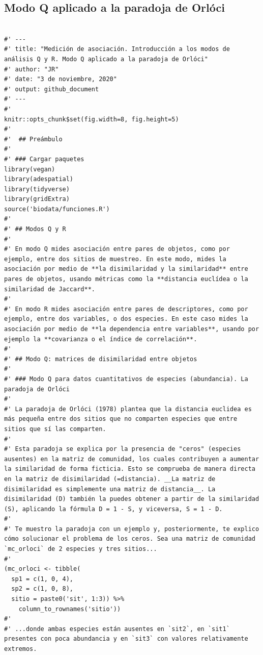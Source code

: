 \documentclass[11pt,]{article}
\begin{document}
\subsection{Modo Q aplicado a la paradoja de
Orlóci}\label{modo-q-aplicado-a-la-paradoja-de-orluxf3ci-1}

\begin{verbatim}

#' ---
#' title: "Medición de asociación. Introducción a los modos de análisis Q y R. Modo Q aplicado a la paradoja de Orlóci"
#' author: "JR"
#' date: "3 de noviembre, 2020"
#' output: github_document
#' ---
#'
knitr::opts_chunk$set(fig.width=8, fig.height=5)
#'
#'  ## Preámbulo
#'  
#' ### Cargar paquetes
library(vegan)
library(adespatial)
library(tidyverse)
library(gridExtra)
source('biodata/funciones.R')
#' 
#' ## Modos Q y R
#' 
#' En modo Q mides asociación entre pares de objetos, como por ejemplo, entre dos sitios de muestreo. En este modo, mides la asociación por medio de **la disimilaridad y la similaridad** entre pares de objetos, usando métricas como la **distancia euclídea o la similaridad de Jaccard**.
#' 
#' En modo R mides asociación entre pares de descriptores, como por ejemplo, entre dos variables, o dos especies. En este caso mides la asociación por medio de **la dependencia entre variables**, usando por ejemplo la **covarianza o el índice de correlación**.
#' 
#' ## Modo Q: matrices de disimilaridad entre objetos
#' 
#' ### Modo Q para datos cuantitativos de especies (abundancia). La paradoja de Orlóci
#' 
#' La paradoja de Orlóci (1978) plantea que la distancia euclidea es más pequeña entre dos sitios que no comparten especies que entre sitios que sí las comparten.
#' 
#' Esta paradoja se explica por la presencia de "ceros" (especies ausentes) en la matriz de comunidad, los cuales contribuyen a aumentar la similaridad de forma ficticia. Esto se comprueba de manera directa en la matriz de disimilaridad (=distancia). __La matriz de disimilaridad es simplemente una matriz de distancia__. La disimilaridad (D) también la puedes obtener a partir de la similaridad (S), aplicando la fórmula D = 1 - S, y viceversa, S = 1 - D.
#'
#' Te muestro la paradoja con un ejemplo y, posteriormente, te explico cómo solucionar el problema de los ceros. Sea una matriz de comunidad `mc_orloci` de 2 especies y tres sitios...
#' 
(mc_orloci <- tibble(
  sp1 = c(1, 0, 4),
  sp2 = c(1, 0, 8),
  sitio = paste0('sit', 1:3)) %>% 
    column_to_rownames('sitio'))
#' 
#' ...donde ambas especies están ausentes en `sit2`, en `sit1` presentes con poca abundancia y en `sit3` con valores relativamente extremos.

\end{verbatim}
\end{document}
